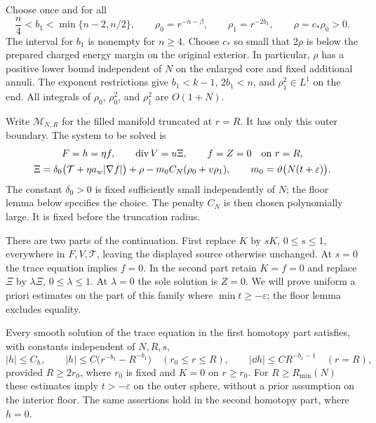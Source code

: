 Choose once and for all
\begin{equation}
 \frac n4<b_1<\min\{n-2,n/2\},\qquad
 \rho_0=r^{-n-\beta},\qquad \rho_1=r^{-2b_1},\qquad
 \rho=c_*\rho_0>0.
 \label{alg:weights}
\end{equation}
The interval for $b_1$ is nonempty for $n\geq4$.  Choose $c_*$ so
small that $2\rho$ is below the prepared charged energy margin on the
original exterior.  In particular, $\rho$ has a positive lower bound
independent of $N$ on the enlarged core and fixed additional annuli.
The exponent restrictions give $b_1<k-1$, $2b_1<n$, and
$\rho_1^2\in L^1$ on the end.  All integrals of $\rho_0$,
$\rho_0^2$, and $\rho_1^2$ are $O(1+N)$.

Write $\mathcal M_{N,R}$ for the filled manifold truncated at $r=R$.
It has only this outer boundary.  The system to be solved is
\begin{equation}
\begin{gathered}
 F=h=\eta f,\qquad \operatorname{div} V=u\Xi,\qquad f=Z=0\quad\text{on }r=R,\\
 \Xi=\delta_0\bigl(\mathcal T+\eta a_w|\nabla f|\bigr)+\rho
       -m_0C_N(\rho_0+v\rho_1),\qquad
 m_0=\vartheta\bigl(N(t+\varepsilon)\bigr).
\end{gathered}
\label{alg:system}
\end{equation}
The constant $\delta_0>0$ is fixed sufficiently small independently of
$N$; the floor lemma below specifies the choice.  The penalty $C_N$ is
then chosen polynomially large.  It is fixed before the truncation radius.

There are two parts of the continuation.  First replace $K$ by $sK$,
$0\leq s\leq1$, everywhere in $F,V,\mathcal T$, leaving the displayed
source otherwise unchanged.  At $s=0$ the trace equation implies $f=0$.
In the second part retain $K=f=0$ and replace $\Xi$ by $\lambda\Xi$,
$0\leq\lambda\leq1$.  At $\lambda=0$ the sole solution is $Z=0$.
We will prove uniform a priori estimates on the part of this family
where $\min t\geq-\varepsilon$; the floor lemma excludes equality.

\begin{lemma}
\label{alg:trace-height}
Every smooth solution of the trace equation in the first homotopy part
satisfies, with constants independent of $N,R,s$,
\begin{equation}
 |h|\leq C_h,\qquad
 |h|\leq C\bigl(r^{-b_1}-R^{-b_1}\bigr)
 \quad(r_0\leq r\leq R),\qquad
 |\dd h|\leq CR^{-b_1-1}\quad(r=R),
 \label{alg:height-bounds}
\end{equation}
provided $R\geq2r_0$, where $r_0$ is fixed and $K=0$ on $r\geq r_0$.
For $R\geq R_{\min}(N)$ these estimates imply $t>-\varepsilon$ on
the outer sphere, without a prior assumption on the interior floor.
The same assertions hold in the second homotopy part, where $h=0$.
\end{lemma}

